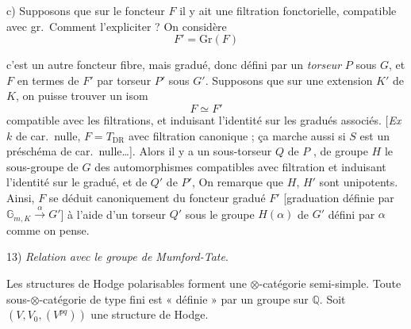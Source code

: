 \documentclass[11pt,a4paper]{article}
\begin{document}
c) Supposons que sur le foncteur $F$ il y ait une filtration fonctorielle,
compatible avec gr.\ Comment l'expliciter ? On considère
\[
  F' = \mathrm{Gr}(F)
\]

c'est un autre foncteur fibre, mais gradué, donc défini par un \emph{torseur}
$P$ \struck{\ill{}} sous $G$, et $F$ en termes de $F'$ \ill{} par torseur
$P'$ sous $G'$. Supposons que sur \struck{\ill{}} une extension $K'$ de $K$,
on puisse trouver un isom
\[
  F \simeq F'
\]
compatible avec les filtrations, et induisant l'identité sur les gradués
associés. [\emph{Ex}  $k$ de car.\ nulle, $F = T_{\mathrm{DR}}$ avec filtration canonique ; ça marche aussi si
$S$ est un préschéma  de car.\ nulle…]. Alors il y a un
sous-torseur  $Q$ de $P$ \struck{\ill{}}, de groupe $H$ le
sous-groupe de $G$ des automorphismes compatibles avec filtration et
induisant l'identité sur le gradué, et de \struck{\ill{}} $Q'$ de $P'$,
 On remarque que $H$, $H'$ sont unipotents. Ainsi,
$F$ se déduit canoniquement du foncteur gradué $F'$ [graduation définie par
$\mathbb{G}_{m,K} \xrightarrow{\ \alpha\ } G'$] à l'aide d'un torseur $Q'$
sous le groupe  $H(\alpha)$ de $G'$ défini par $\alpha$
comme on pense.


13) \emph{Relation avec le groupe de  Mumford-Tate}.

Les structures de Hodge polarisables forment une $\otimes$-catégorie
semi-simple. Toute sous-$\otimes$-catégorie de type fini est « définie » par
un groupe  \ill{} sur $\mathbb{Q}$. Soit $(V, V_{0}, (V^{pq}))$
une structure de Hodge. \ill{}
\end{document}
